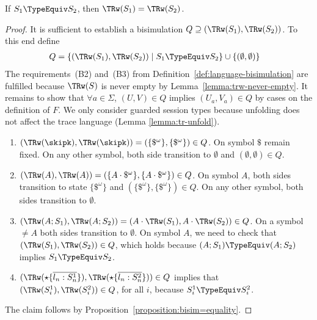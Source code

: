 \begin{proposition}
  If $S_1 \TypeEquiv S_2$, then $\TRw (S_1) = \TRw (S_2)$.
\end{proposition}
\begin{proof}
  It is sufficient to establish a bisimulation $Q \supseteq (\TRw (S_1), \TRw (S_2))$. To this end
  define 
  \begin{align*}
    Q &= \{ (\TRw (S_1), \TRw (S_2)) \mid S_1 \TypeEquiv S_2 \} \cup \{(\emptyset, \emptyset)\}
  \end{align*}
  The requirements~(B2) and~(B3) from Definition~\ref{def:language-bisimulation} are fulfilled because
  $\TRw (S)$ is never empty by Lemma~\ref{lemma:trw-never-empty}. It remains to show that $\forall
  a\in\Sigma$, $(U,V) \in Q$ implies $(U_a, V_a) \in Q$ by cases on the definition of $F$. We only
  consider guarded session types because unfolding does not affect the trace language (Lemma
  \ref{lemma:tr-unfold}). 
  \begin{enumerate}
  \item $(\TRw (\skipk), \TRw (\skipk)) = (\{\$^\omega\}, \{\$^\omega\}) \in Q$. On symbol $\$$
    remain fixed. On any other symbol, both side transition to $\emptyset$ and
    $(\emptyset,\emptyset) \in Q$.
  \item $(\TRw (A), \TRw (A)) = (\{A\cdot\$^\omega\}, \{A\cdot\$^\omega\}) \in Q$. On symbol $A$,
    both sides transition to state $\{\$^\omega\}$ and $(\{\$^\omega\}, \{\$^\omega\}) \in Q$. On
    any other symbol, both sides transition to $\emptyset$.
  \item $(\TRw (A;S_1), \TRw (A;S_2)) = (A\cdot\TRw (S_1), A\cdot\TRw (S_2)) \in Q$. On a symbol
    $\ne A$ both sides transition to $\emptyset$. On symbol $A$, we need to check that $(\TRw
    (S_1),\TRw (S_2)) \in Q$, which holds because $(A;S_1) \TypeEquiv (A;S_2)$ implies $S_1
    \TypeEquiv S_2$. 
  \item $(\TRw (\star\{\overline{l_n:S^1_n}\}), \TRw (\star\{\overline{l_n:S^2_n}\})) \in Q$ implies
    that $(\TRw (S^1_i), \TRw (S^2_i)) \in Q$, for all $i$, because $S^1_i \TypeEquiv S^2_i$.
  \end{enumerate}
  The claim follows by Proposition~\ref{proposition:bisim=equality}.
\end{proof}

